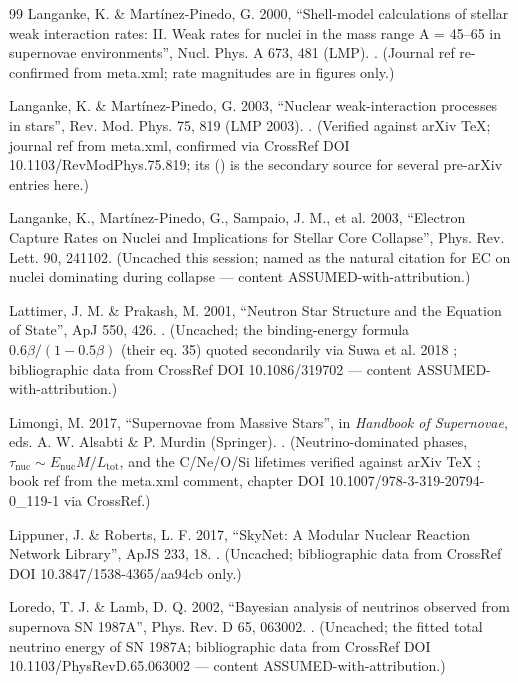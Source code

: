 \begin{thebibliography}{99}
Langanke, K. \& Mart\'inez-Pinedo, G. 2000, ``Shell-model calculations of stellar weak interaction rates: II. Weak rates for nuclei in the mass range A = 45--65 in supernovae environments'', Nucl. Phys. A 673, 481 (LMP). . (Journal ref re-confirmed from meta.xml; rate magnitudes are in figures only.)

Langanke, K. \& Mart\'inez-Pinedo, G. 2003, ``Nuclear weak-interaction processes in stars'', Rev. Mod. Phys. 75, 819 (LMP 2003). . (Verified against arXiv TeX; journal ref from meta.xml, confirmed via CrossRef DOI 10.1103/RevModPhys.75.819; its  () is the secondary source for several pre-arXiv entries here.)

Langanke, K., Mart\'inez-Pinedo, G., Sampaio, J. M., et al. 2003, ``Electron Capture Rates on Nuclei and Implications for Stellar Core Collapse'', Phys. Rev. Lett. 90, 241102. (Uncached this session; named as the natural citation for EC on nuclei dominating during collapse --- content ASSUMED-with-attribution.)

Lattimer, J. M. \& Prakash, M. 2001, ``Neutron Star Structure and the Equation of State'', ApJ 550, 426. . (Uncached; the binding-energy formula $0.6\beta/(1 - 0.5\beta)$ (their eq. 35) quoted secondarily via Suwa et al. 2018 ; bibliographic data from CrossRef DOI 10.1086/319702 --- content ASSUMED-with-attribution.)

Limongi, M. 2017, ``Supernovae from Massive Stars'', in \emph{Handbook of Supernovae}, eds. A. W. Alsabti \& P. Murdin (Springer). . (Neutrino-dominated phases, $\tau_{\mathrm{nuc}} \sim E_{\mathrm{nuc}} M/L_{\mathrm{tot}}$, and the C/Ne/O/Si lifetimes verified against arXiv TeX ; book ref from the meta.xml comment, chapter DOI 10.1007/978-3-319-20794-0\_119-1 via CrossRef.)

Lippuner, J. \& Roberts, L. F. 2017, ``SkyNet: A Modular Nuclear Reaction Network Library'', ApJS 233, 18. . (Uncached; bibliographic data from CrossRef DOI 10.3847/1538-4365/aa94cb only.)

Loredo, T. J. \& Lamb, D. Q. 2002, ``Bayesian analysis of neutrinos observed from supernova SN 1987A'', Phys. Rev. D 65, 063002. . (Uncached; the fitted total neutrino energy of SN 1987A; bibliographic data from CrossRef DOI 10.1103/PhysRevD.65.063002 --- content ASSUMED-with-attribution.)


\end{thebibliography}
